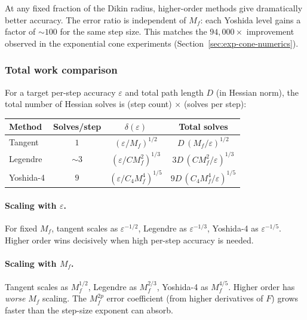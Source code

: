 \documentclass[11pt]{article}
\begin{document}
At any fixed fraction of the Dikin radius, higher-order methods
give dramatically better accuracy.  The error ratio is independent
of $M_f$: each Yoshida level gains a factor of $\sim\!100$ for
the same step size.  This matches the $94{,}000\times$ improvement
observed in the exponential cone experiments
(Section~\ref{sec:exp-cone-numerics}).

\subsubsection{Total work comparison}

For a target per-step accuracy $\varepsilon$ and total path length
$D$ (in Hessian norm), the total number of Hessian solves is
(step count) $\times$ (solves per step):
\begin{center}
\renewcommand{\arraystretch}{1.2}
\begin{tabular}{@{}lccc@{}}
\toprule
\textbf{Method} & \textbf{Solves/step} & \textbf{$\delta(\varepsilon)$} &
  \textbf{Total solves} \\
\midrule
Tangent & $1$ & $(\varepsilon/M_f)^{1/2}$ &
  $D\,(M_f/\varepsilon)^{1/2}$ \\
Legendre & $\sim\!3$ & $(\varepsilon/CM_f^2)^{1/3}$ &
  $3D\,(CM_f^2/\varepsilon)^{1/3}$ \\
Yoshida-4 & $9$ & $(\varepsilon/C_4 M_f^4)^{1/5}$ &
  $9D\,(C_4 M_f^4/\varepsilon)^{1/5}$ \\
\bottomrule
\end{tabular}
\end{center}

\paragraph{Scaling with $\varepsilon$.}
For fixed $M_f$, tangent scales as $\varepsilon^{-1/2}$, Legendre as
$\varepsilon^{-1/3}$, Yoshida-4 as $\varepsilon^{-1/5}$.  Higher
order wins decisively when high per-step accuracy is needed.

\paragraph{Scaling with $M_f$.}
Tangent scales as $M_f^{1/2}$, Legendre as $M_f^{2/3}$, Yoshida-4
as $M_f^{4/5}$.  Higher order has \emph{worse} $M_f$ scaling.
The $M_f^{2p}$ error coefficient (from higher derivatives of $F$)
grows faster than the step-size exponent can absorb.
\end{document}
